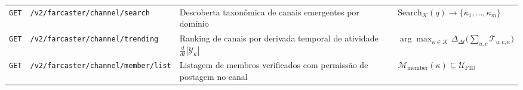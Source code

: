 \documentclass[11pt,a4paper]{article}
\begin{document}
\begin{longtable}{@{}p{1.15cm}>{\raggedright\arraybackslash}p{5.65cm}>{\raggedright\arraybackslash}p{4.15cm}>{\raggedright\arraybackslash}p{4.85cm}@{}}
\rowcolor{slateBg}
\texttt{GET} & \texttt{/v2/farcaster/channel/search} & Descoberta taxonômica de canais emergentes por domínio & $\text{Search}_{\mathcal{K}}(q) \to \{\kappa_1, \dots, \kappa_m\}$ \\
\texttt{GET} & \texttt{/v2/farcaster/channel/trending} & Ranking de canais por derivada temporal de atividade $\frac{d}{dt}|\mathcal{Y}_\kappa|$ & $\arg\max_{\kappa \in \mathcal{K}} \Delta_{\Delta t}\big(\sum_{u,c} \mathcal{T}_{u,c,\kappa}\big)$ \\
\rowcolor{slateBg}
\texttt{GET} & \texttt{/v2/farcaster/channel/member/list} & Listagem de membros verificados com permissão de postagem no canal & $\mathcal{M}_{\text{member}}(\kappa) \subseteq \mathcal{U}_{\text{FID}}$ \\
\end{longtable}
\end{document}
